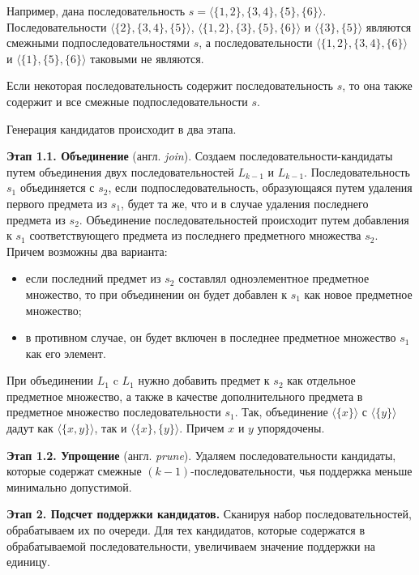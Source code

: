 Например, дана последовательность $s = \langle\{1,2\},\{3,4\},\{5\},\{6\}\rangle$. Последовательности $\langle\{2\},\{3,4\},\{5\}\rangle$, $\langle\{1,2\},\{3\},\{5\},\{6\}\rangle$ и $\langle\{3\},\{5\}\rangle$ являются смежными подпоследовательностями $s$, а последовательности $\langle\{1,2\},\{3,4\},\{6\}\rangle$ и $\langle\{1\},\{5\},\{6\}\rangle$ таковыми не являются.

Если некоторая последовательность содержит последовательность $s$, то она также содержит и все смежные подпоследовательности $s$.

Генерация кандидатов происходит в два этапа.

\textbf{Этап 1.1. Объединение} (англ. \textit{join}). Создаем последовательности-кандидаты путем объединения двух последовательностей $L_{k−1}$ и $L_{k−1}$. Последовательность $s_1$ объединяется с $s_2$, если подпоследовательность, образующаяся путем удаления первого предмета из $s_1$, будет та же, что и в случае удаления последнего предмета из $s_2$. Объединение последовательностей происходит путем добавления к $s_1$ соответствующего предмета из последнего предметного множества $s_2$. Причем возможны два варианта:
\begin{itemize}
	\item если последний предмет из $s_2$ составлял одноэлементное предметное множество, то при объединении он будет добавлен к $s_1$ как новое предметное множество;
	\item в противном случае, он будет включен в последнее предметное множество $s_1$ как его элемент.
\end{itemize}

При объединении $L_1$ c $L_1$ нужно добавить предмет к $s_2$ как отдельное предметное множество, а также в качестве дополнительного предмета в предметное множество последовательности $s_1$. Так, объединение $\langle\{x\}\rangle$ с $\langle\{y\}\rangle$ дадут как $\langle\{x, y\}\rangle$, так и $\langle\{x\},\{y\}\rangle$. Причем $x$ и $y$ упорядочены.

\textbf{Этап 1.2. Упрощение} (англ. \textit{prune}). Удаляем последовательности кандидаты, которые содержат смежные $(k-1)$-последовательности, чья поддержка меньше минимально допустимой.

\textbf{Этап 2. Подсчет поддержки кандидатов.} Сканируя набор последовательностей, обрабатываем их по очереди. Для тех кандидатов, которые содержатся в обрабатываемой последовательности, увеличиваем значение поддержки на единицу.	

